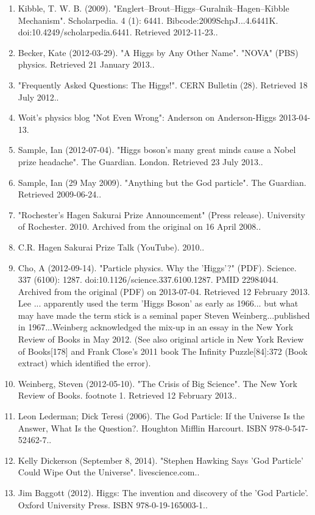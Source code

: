 \begin{enumerate}
    \item Kibble, T. W. B. (2009). "Englert–Brout–Higgs–Guralnik–Hagen–Kibble Mechanism". Scholarpedia. 4 (1): 6441. Bibcode:2009SchpJ...4.6441K. doi:10.4249/scholarpedia.6441. Retrieved 2012-11-23..
    \item Becker, Kate (2012-03-29). "A Higgs by Any Other Name". "NOVA" (PBS) physics. Retrieved 21 January 2013..
    \item "Frequently Asked Questions: The Higgs!". CERN Bulletin (28). Retrieved 18 July 2012..
    \item Woit's physics blog "Not Even Wrong": Anderson on Anderson-Higgs 2013-04-13.
    \item Sample, Ian (2012-07-04). "Higgs boson's many great minds cause a Nobel prize headache". The Guardian. London. Retrieved 23 July 2013..
    \item Sample, Ian (29 May 2009). "Anything but the God particle". The Guardian. Retrieved 2009-06-24..
    \item "Rochester's Hagen Sakurai Prize Announcement" (Press release). University of Rochester. 2010. Archived from the original on 16 April 2008..
    \item C.R. Hagen Sakurai Prize Talk (YouTube). 2010..
    \item Cho, A (2012-09-14). "Particle physics. Why the 'Higgs'?" (PDF). Science. 337 (6100): 1287. doi:10.1126/science.337.6100.1287. PMID 22984044. Archived from the original (PDF) on 2013-07-04. Retrieved 12 February 2013. Lee ... apparently used the term 'Higgs Boson' as early as 1966... but what may have made the term stick is a seminal paper Steven Weinberg...published in 1967...Weinberg acknowledged the mix-up in an essay in the New York Review of Books in May 2012. (See also original article in New York Review of Books[178] and Frank Close's 2011 book The Infinity Puzzle[84]:372 (Book extract) which identified the error).
    \item Weinberg, Steven (2012-05-10). "The Crisis of Big Science". The New York Review of Books. footnote 1. Retrieved 12 February 2013..
    \item Leon Lederman; Dick Teresi (2006). The God Particle: If the Universe Is the Answer, What Is the Question?. Houghton Mifflin Harcourt. ISBN 978-0-547-52462-7..
    \item Kelly Dickerson (September 8, 2014). "Stephen Hawking Says 'God Particle' Could Wipe Out the Universe". livescience.com..
    \item Jim Baggott (2012). Higgs: The invention and discovery of the 'God Particle'. Oxford University Press. ISBN 978-0-19-165003-1..

\end{enumerate}
